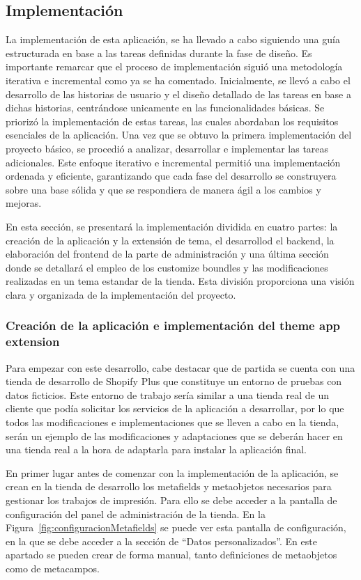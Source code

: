 \documentclass[12pt]{article}
\begin{document}
\subsection{Implementación}
La implementación de esta aplicación, se ha llevado a cabo siguiendo una guía estructurada en base a las tareas definidas durante la fase de diseño.
Es importante remarcar que el proceso de implementación siguió una metodología iterativa e incremental como ya se ha comentado. Inicialmente, se llevó a cabo el desarrollo
de las historias de usuario y el diseño detallado de las tareas en base a dichas historias, centrándose unicamente en las funcionalidades básicas. Se priorizó
la implementación de estas tareas, las cuales abordaban los requisitos esenciales de la aplicación. Una vez que se obtuvo la primera implementación del
proyecto básico, se procedió a analizar, desarrollar e implementar las tareas adicionales. Este enfoque iterativo e incremental permitió una implementación
ordenada y eficiente, garantizando que cada fase del desarrollo se construyera sobre una base sólida y que se respondiera de manera ágil a los cambios y mejoras.

En esta sección, se presentará la implementación dividida en cuatro partes: la creación de la aplicación y la extensión de tema, el desarrollod el backend, la elaboración del frontend de la parte de administración y una última sección donde se detallará el empleo de los customize boundles y las modificaciones realizadas en un tema estandar de la tienda. Esta división 
proporciona una visión clara y organizada de la implementación del proyecto.

\subsubsection{Creación de la aplicación e implementación del theme app extension}
Para empezar con este desarrollo, cabe destacar que de partida se cuenta con una tienda de desarrollo de Shopify Plus que constituye un entorno de pruebas con datos ficticios.
Este entorno de trabajo sería similar a una tienda real de un cliente que podía solicitar los servicios de la aplicación a desarrollar, por lo que todos las modificaciones e implementaciones
que se lleven a cabo en la tienda, serán un ejemplo de las modificaciones y adaptaciones que se deberán hacer en una tienda real a la hora de adaptarla para instalar la aplicación final.

En primer lugar antes de comenzar con la implementación de la aplicación, se crean en la tienda de desarrollo los metafields y metaobjetos necesarios para gestionar
los trabajos de impresión. Para ello se debe acceder a la pantalla de configuración del panel de administración de la tienda. En la Figura~\ref{fig:configuracionMetafields} se puede ver
esta pantalla de configuración, en la que se debe acceder a la sección de ``Datos personalizados''. En este apartado se pueden crear de forma manual,
tanto definiciones de metaobjetos como de metacampos.
\end{document}
